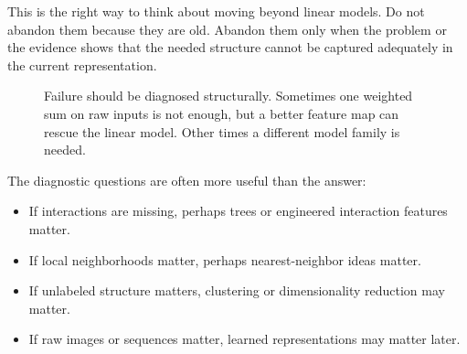 This is the right way to think about moving beyond linear models. Do not abandon them because they are old. Abandon them only when the problem or the evidence shows that the needed structure cannot be captured adequately in the current representation.

\begin{figure}[t]
\centering
{}
\caption{Failure should be diagnosed structurally. Sometimes one weighted sum on raw inputs is not enough, but a better feature map can rescue the linear model. Other times a different model family is needed.}
\label{fig:linear-model-failure}
\end{figure}

The diagnostic questions are often more useful than the answer:
\begin{itemize}[leftmargin=*]
\item If interactions are missing, perhaps trees or engineered interaction features matter.
\item If local neighborhoods matter, perhaps nearest-neighbor ideas matter.
\item If unlabeled structure matters, clustering or dimensionality reduction may matter.
\item If raw images or sequences matter, learned representations may matter later.
\end{itemize}

